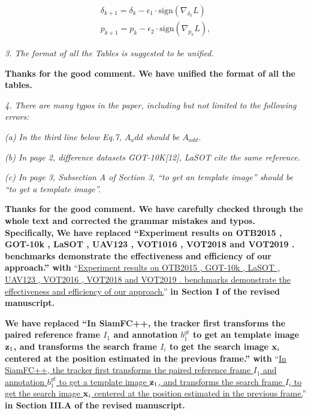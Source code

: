 \documentclass[12pt]{article}
\begin{document}
\begin{gather}
  \delta_{k+1} = \delta_{k} - \epsilon_1 \cdot \text{sign}(\nabla_{\delta_k}L)\\
  p_{k+1} = p_{k} - \epsilon_2 \cdot \text{sign}(\nabla_{p_k}L),
\end{gather}


\textit{3. The format of all the Tables is suggested to be unified.}

\textbf{Thanks for the good comment. We have unified the format of all the tables.}

\textit{4. There are many typos in the paper, including but not limited to the following errors:}

\textit{(a) In the third line below Eq.7, $A_{a}dd$ should be $A_{add}$.}

\textit{(b) In page 2, difference datasets GOT-10K[12], LaSOT \cite{LaSOT} cite the same reference.}

\textit{(c) In page 3, Subsection A of Section 3, “to get an template image” should be “to get a template image”.}

\textbf{Thanks for the good comment. We have carefully checked through the whole text and corrected the grammar mistakes and typos. Specifically,}
\textbf{We have replaced ``Experiment results on OTB2015 \cite{OTB}, GOT-10k \cite{GOT-10k}, LaSOT \cite{GOT-10k}, UAV123 \cite{UAV123}, VOT1016 \cite{VOT2016}, VOT2018 \cite{VOT2018} and VOT2019 \cite{VOT2019}. benchmarks demonstrate the effectiveness and efficiency of our approach.'' with}
``\uline{Experiment results on OTB2015 \cite{OTB}, GOT-10k \cite{GOT-10k}, LaSOT \cite{LaSOT}, UAV123 \cite{UAV123}, VOT2016 \cite{VOT2016}, VOT2018 \cite{VOT2018} and VOT2019 \cite{VOT2019}. benchmarks demonstrate the effectiveness and efficiency of our approach.}''
\textbf{in Section I of the revised manuscript.}

\textbf{We have replaced ``In SiamFC++, the tracker first transforms the paired reference frame $I_1$ and annotation $b_1^{gt}$ to get an template image $\textbf z_1$, and transforms the search frame $I_i$ to get the search image $\textbf x_i$ centered at the position estimated in the previous frame.'' with}
``\uline{In SiamFC++, the tracker first transforms the paired reference frame $I_1$ and annotation $b_1^{gt}$ to get a template image $\textbf z_1$, and transforms the search frame $I_i$ to get the search image $\textbf x_i$ centered at the position estimated in the previous frame.}''
\textbf{in Section III.A of the revised manuscript.}
\end{document}
